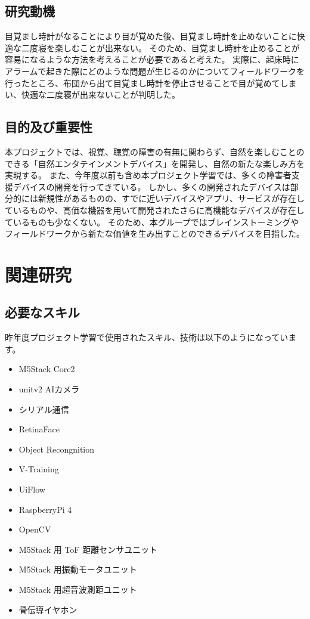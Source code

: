 \section{研究動機}
目覚まし時計がなることにより目が覚めた後、目覚まし時計を止めないことに快適な二度寝を楽しむことが出来ない。
そのため、目覚まし時計を止めることが容易になるような方法を考えることが必要であると考えた。
実際に、起床時にアラームで起きた際にどのような問題が生じるのかについてフィールドワークを行ったところ、布団から出て目覚まし時計を停止させることで目が覚めてしまい、快適な二度寝が出来ないことが判明した。

\section{目的及び重要性}
本プロジェクトでは、視覚、聴覚の障害の有無に関わらず、自然を楽しむことのできる「自然エンタテインメントデバイス」を開発し、自然の新たな楽しみ方を実現する。
また、今年度以前も含め本プロジェクト学習では、多くの障害者支援デバイスの開発を行ってきている。
しかし、多くの開発されたデバイスは部分的には新規性があるものの、すでに近いデバイスやアプリ、サービスが存在しているものや、高価な機器を用いて開発されたさらに高機能なデバイスが存在しているものも少なくない。
そのため、本グループではブレインストーミングやフィールドワークから新たな価値を生み出すことのできるデバイスを目指した。

\chapter{関連研究}
\section{必要なスキル}
昨年度プロジェクト学習で使用されたスキル、技術は以下のようになっています。
\begin{itemize}
  \item M5Stack Core2
  \item unitv2 AIカメラ
  \item シリアル通信
  \item RetinaFace
  \item Object Recongnition
  \item V-Training
  \item UiFlow
  \item RaspberryPi 4
  \item OpenCV
  \item M5Stack 用 ToF 距離センサユニット
  \item M5Stack 用振動モータユニット
  \item M5Stack 用超音波測距ユニット
  \item 骨伝導イヤホン
\end{itemize}

